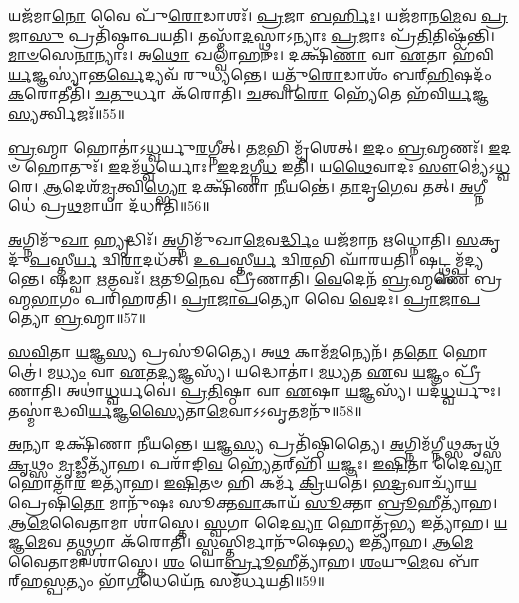 𑌯𑌜᳴𑌮𑌾\-\ul{𑌨𑍋} 𑌵𑍈 𑌪𑍁᳴\-\ul{𑌰𑍋}\-𑌡𑌾𑌶𑌃᳴।
\-\ul{𑌪𑍍𑌰}\-𑌜𑌾 \ul{𑌬}\-\-\ul{𑌰𑍍}\-𑌹𑌿𑌃।
𑌯𑌜᳴𑌮𑌾𑌨\-\ul{𑌮𑍇}\-𑌵 \ul{𑌪𑍍𑌰}\-𑌜𑌾\-\ul{𑌸𑍁} 𑌪𑍍𑌰𑌤𑌿᳴\-𑌷𑍍𑌠𑌾𑌪𑌯𑌤𑌿।
𑌤𑌸𑍍𑌮𑌾᳴\-\ul{𑌦}\-𑌸𑍍𑌥𑍍𑌨𑌾\-𑌽𑌨𑍍𑌯𑌾𑌃 \ul{𑌪𑍍𑌰}\-𑌜𑌾𑌃 𑌪𑍍𑌰᳴\-\ul{𑌤𑌿}\-𑌤𑌿𑌷𑍍𑌠᳴𑌨𑍍𑌤𑌿।
\-\ul{𑌮𑌾}\-\-\ul{𑍞}\-\-𑌸𑍇\-\ul{𑌨𑌾}\-𑌨𑍍𑌯𑌾𑌃।
𑌅\-\ul{𑌥𑍋} 𑌖𑌲𑍍𑌵𑌾᳴𑌹𑍁𑌃।
𑌦𑌕𑍍𑌷𑌿᳴\-\ul{𑌣𑌾} 𑌵𑌾 \ul{𑌏}\-𑌤𑌾 𑌹᳴𑌵𑌿\-\ul{𑌰𑍍𑌯}\-𑌜𑍍𑌞𑌸𑍍𑌯𑌾॑𑌨𑍍𑌤\-\ul{𑌰𑍍𑌵𑍇}\-𑌦𑍍𑌯𑌵᳴ 𑌰𑍁𑌧𑍍𑌯𑌨𑍍𑌤𑍇।
𑌯𑌤𑍍𑌪𑍁᳴\-\ul{𑌰𑍋}\-𑌡𑌾𑌶𑌂᳴ 𑌬𑌰𑍍‌\mbox{}\-\ul{𑌹𑌿}\-𑌷𑌦𑌂᳴ \ul{𑌕}\-𑌰𑍋𑌤𑍀𑌤𑌿᳴।
\-\ul{𑌚}\-\-\ul{𑌤𑍁}\-𑌰𑍍𑌧𑌾 𑌕᳴𑌰𑍋𑌤𑌿।
\-\ul{𑌚}\-𑌤𑍍𑌵𑌾\-\ul{𑌰𑍋} 𑌹𑍍𑌯𑍇᳴𑌤𑍇 𑌹᳴𑌵𑌿\-\ul{𑌰𑍍𑌯}\-𑌜𑍍𑌞\-\ul{𑌸𑍍𑌯}\-𑌰𑍍𑌤𑍍𑌵𑌿𑌜𑌃᳴॥55॥

\-\ul{𑌬𑍍𑌰}\-𑌹𑍍𑌮𑌾 𑌹𑍋𑌤𑌾॑\-𑌽\-\ul{𑌧𑍍𑌵}\-𑌰𑍍𑌯𑍁\-\ul{𑌰}\-𑌗𑍍𑌨𑍀𑌤𑍍।
𑌤\-\ul{𑌮}\-𑌭𑌿 𑌮𑍃᳴𑌶𑍇𑌤𑍍।
\-\ul{𑌇}\-𑌦𑌂 \ul{𑌬𑍍𑌰}\-𑌹𑍍𑌮𑌣𑌃᳴।
\-\ul{𑌇}\-𑌦𑍞 𑌹𑍋𑌤𑍁𑌃᳴।
\-\ul{𑌇}\-𑌦𑌮᳴\-\ul{𑌧𑍍𑌵}\-𑌰𑍍𑌯𑍋𑌃।
\-\ul{𑌇}\-𑌦\-\ul{𑌮}\-𑌗𑍍𑌨𑍀\-\ul{𑌧} 𑌇𑌤𑌿᳴।
𑌯\-\ul{𑌥𑍈}\-𑌵𑌾𑌦𑌃 \ul{𑌸𑍗}\-𑌮𑍍𑌯𑍇॑\-𑌽\-\ul{𑌧𑍍𑌵}\-𑌰𑍇।
\-\ul{𑌆}\-𑌦𑍇𑌶᳴\-\ul{𑌮𑍃}\-𑌤𑍍𑌵𑌿\-\ul{𑌗𑍍𑌭𑍍𑌯𑍋} 𑌦𑌕𑍍𑌷𑌿᳴𑌣𑌾 \ul{𑌨𑍀}\-𑌯𑌨𑍍𑌤𑍇॑।
\-\ul{𑌤𑌾}\-𑌦𑍃\-\ul{𑌗𑍇}\-𑌵 𑌤𑌤𑍍।
\-\ul{𑌅}\-𑌗𑍍𑌨𑍀𑌧𑍇॑ 𑌪𑍍𑌰\-\ul{𑌥}\-𑌮𑌾𑌯𑌾 𑌦᳴𑌧𑌾𑌤𑌿॥56॥

\-\ul{𑌅}\-𑌗𑍍𑌨𑌿𑌮𑍁᳴\-\ul{𑌖𑌾} 𑌹𑍍𑌯𑍃𑌦𑍍𑌧𑌿𑌃᳴।
\-\ul{𑌅}\-𑌗𑍍𑌨𑌿𑌮𑍁᳴𑌖𑌾\-\ul{𑌮𑍇}\-𑌵\-\ul{𑌰𑍍𑌦𑍍𑌧𑌿𑌂} 𑌯𑌜᳴𑌮𑌾𑌨 𑌋𑌧𑍍𑌨𑍋𑌤𑌿।
\-\ul{𑌸}\-𑌕𑍃𑌦𑍁᳴\-\ul{𑌪}\-𑌸𑍍𑌤𑍀\-\ul{𑌰𑍍𑌯} 𑌦𑍍𑌵𑌿\-\ul{𑌰𑌾}\-𑌦𑌧᳴𑌤𑍍।
\-\ul{𑌉}\-\-\ul{𑌪}\-𑌸𑍍𑌤𑍀\-\ul{𑌰𑍍𑌯} 𑌦𑍍𑌵𑌿\-\ul{𑌰}\-𑌭𑌿 𑌘𑌾᳴𑌰𑌯𑌤𑌿।
𑌷𑌟𑍍𑌥𑍍𑌸𑌮𑍍𑌪᳴𑌦𑍍𑌯𑌨𑍍𑌤𑍇।
𑌷𑌡𑍍𑌵𑌾 \ul{𑌋}\-𑌤𑌵𑌃᳴।
\-\ul{𑌋}\-𑌤𑍂\-\ul{𑌨𑍇}\-𑌵 𑌪𑍍𑌰𑍀᳴𑌣𑌾𑌤𑌿।
\-\ul{𑌵𑍇}\-𑌦𑍇𑌨᳴ \ul{𑌬𑍍𑌰}\-𑌹𑍍𑌮𑌣𑍇॑ 𑌬𑍍𑌰𑌹𑍍𑌮\-\ul{𑌭𑌾}\-𑌗𑌂 𑌪𑌰𑌿᳴𑌹𑌰𑌤𑌿।
\-\ul{𑌪𑍍𑌰𑌾}\-\-\ul{𑌜𑌾}\-\-\ul{𑌪}\-𑌤𑍍𑌯𑍋 𑌵𑍈 \ul{𑌵𑍇}\-𑌦𑌃।
\-\ul{𑌪𑍍𑌰𑌾}\-\-\ul{𑌜𑌾}\-\-\ul{𑌪}\-𑌤𑍍𑌯𑍋 \ul{𑌬𑍍𑌰}\-𑌹𑍍𑌮𑌾॥57॥

\-\ul{𑌸}\-\-\ul{𑌵𑌿}\-𑌤𑌾 \ul{𑌯}\-𑌜𑍍𑌞\-\ul{𑌸𑍍𑌯} 𑌪𑍍𑌰𑌸𑍂॑𑌤𑍍𑌯𑍈।
𑌅\-\ul{𑌥} 𑌕𑌾𑌮᳴\-\ul{𑌮}\-𑌨𑍍𑌯𑍇𑌨᳴।
𑌤\-\ul{𑌤𑍋} 𑌹𑍋𑌤𑍍𑌰𑍇॑।
𑌮\-\ul{𑌧𑍍𑌯𑌂} 𑌵𑌾 \ul{𑌏}\-𑌤\-\ul{𑌦𑍍𑌯}\-𑌜𑍍𑌞𑌸𑍍𑌯᳴।
𑌯𑌦𑍍𑌧𑍋𑌤𑌾॑।
\-\ul{𑌮}\-\-\ul{𑌧𑍍𑌯}\-𑌤 \ul{𑌏}\-𑌵 \ul{𑌯}\-𑌜𑍍𑌞𑌂 𑌪𑍍𑌰𑍀᳴𑌣𑌾𑌤𑌿।
𑌅𑌥𑌾॑\-\ul{𑌧𑍍𑌵}\-𑌰𑍍𑌯𑌵𑍇॑।
\-\ul{𑌪𑍍𑌰}\-\-\ul{𑌤𑌿}\-𑌷𑍍𑌠𑌾 𑌵𑌾 \ul{𑌏}\-𑌷𑌾 \ul{𑌯}\-𑌜𑍍𑌞𑌸𑍍𑌯᳴।
𑌯𑌦᳴\-\ul{𑌧𑍍𑌵}\-𑌰𑍍𑌯𑍁𑌃।
𑌤𑌸𑍍𑌮𑌾॑𑌦𑍍𑌧𑌵𑌿\-\ul{𑌰𑍍𑌯}\-𑌜𑍍𑌞\-\ul{𑌸𑍍𑌯𑍈}\-𑌤𑌾\-\ul{𑌮𑍇}\-𑌵𑌾𑌽𑌽𑌵𑍃\-\ul{𑌤}\-𑌮𑌨𑍁᳴॥58॥

\-\ul{𑌅}\-𑌨𑍍𑌯𑌾 𑌦𑌕𑍍𑌷𑌿᳴𑌣𑌾 𑌨𑍀𑌯𑌨𑍍𑌤𑍇।
\-\ul{𑌯}\-𑌜𑍍𑌞\-\ul{𑌸𑍍𑌯} 𑌪𑍍𑌰𑌤𑌿᳴\-𑌷𑍍𑌠𑌿𑌤𑍍𑌯𑍈।
\-\ul{𑌅}\-𑌗𑍍𑌨𑌿𑌮᳴𑌗𑍍𑌨𑍀\-\ul{𑌥𑍍𑌸}\-𑌕𑍃𑌥𑍍𑌸᳴\-\-\ul{𑌕𑍃}\-𑌥𑍍𑌸𑌂 \ul{𑌮𑍃}\-𑌡𑍍𑌢𑍀𑌤𑍍𑌯𑌾᳴𑌹।
𑌪𑌰𑌾᳴𑌙𑌿\-\ul{𑌵} 𑌹𑍍𑌯𑍇᳴𑌤𑌰𑍍‌\mbox{}𑌹𑌿᳴ \ul{𑌯}\-𑌜𑍍𑌞𑌃।
\-\ul{𑌇}\-\-\ul{𑌷𑌿}\-𑌤𑌾 𑌦𑍈\-\ul{𑌵𑍍𑌯𑌾} 𑌹𑍋𑌤𑌾᳴\-\ul{𑌰} 𑌇𑌤𑍍𑌯𑌾᳴𑌹।
\-\ul{𑌇}\-\-\ul{𑌷𑌿}\-𑌤𑍞 𑌹𑌿 𑌕𑌰𑍍𑌮᳴ \ul{𑌕𑍍𑌰𑌿}\-𑌯𑌤𑍇॑।
\-\ul{𑌭}\-\-\ul{𑌦𑍍𑌰}\-𑌵𑌾𑌚𑍍𑌯𑌾᳴\-\ul{𑌯} 𑌪𑍍𑌰𑍇𑌷𑌿᳴\-\ul{𑌤𑍋} 𑌮𑌾𑌨𑍁᳴𑌷𑌃 𑌸𑍂𑌕𑍍𑌤\-\ul{𑌵𑌾}\-𑌕𑌾𑌯᳴ \ul{𑌸𑍂}\-𑌕𑍍𑌤𑌾 \ul{𑌬𑍍𑌰𑍂}\-𑌹𑍀𑌤𑍍𑌯𑌾᳴𑌹।
\-\ul{𑌆}\-\-\-\ul{𑌮𑍇}\-𑌵𑍈𑌤𑌾𑌮𑌾 𑌶𑌾॑𑌸𑍍𑌤𑍇।
\-\ul{𑌸𑍍𑌵}\-𑌗𑌾 𑌦𑍈\-\ul{𑌵𑍍𑌯𑌾} 𑌹𑍋𑌤𑍃᳴\-\ul{𑌭𑍍𑌯} 𑌇𑌤𑍍𑌯𑌾᳴𑌹।
\-\ul{𑌯}\-𑌜𑍍𑌞\-\ul{𑌮𑍇}\-𑌵 𑌤\-\ul{𑌥𑍍𑌸𑍍𑌵}\-𑌗𑌾 𑌕᳴𑌰𑍋𑌤𑌿।
\-\ul{𑌸𑍍𑌵}\-𑌸𑍍𑌤𑌿𑌰𑍍𑌮𑌾𑌨𑍁᳴𑌷𑍇\-\ul{𑌭𑍍𑌯} 𑌇𑌤𑍍𑌯𑌾᳴𑌹।
\-\ul{𑌆}\-\-\-\ul{𑌮𑍇}\-𑌵𑍈𑌤𑌾𑌮𑌾 𑌶𑌾॑𑌸𑍍𑌤𑍇।
\-\ul{𑌶𑌂} 𑌯𑍋\-\ul{𑌰𑍍𑌬𑍍𑌰𑍂}\-𑌹𑍀𑌤𑍍𑌯𑌾᳴𑌹।
\-\ul{𑌶𑌂}\-𑌯𑍁\-\ul{𑌮𑍇}\-𑌵 𑌬𑌾᳴𑌰𑍍‌\mbox{}𑌹\-\ul{𑌸𑍍𑌪}\-𑌤𑍍𑌯𑌂 𑌭𑌾᳴\-\ul{𑌗}\-𑌧𑍇𑌯𑍇᳴\-\ul{𑌨} 𑌸𑌮᳴𑌰𑍍𑌧𑌯𑌤𑌿॥59॥\anuvakamend[\-\ul{𑌚}\-\-\ul{𑌰}\-\-\ul{𑌤𑍍𑌯}\-\-\ul{𑌧𑍍𑌵}\-𑌰𑍍𑌯𑍁𑌃 𑌪𑍍𑌰𑌜𑌾᳴𑌤𑌿𑌰𑍍𑌹𑍍𑌵𑌯\-\ul{𑌤𑍇} 𑌵𑍇𑌦𑌾॑𑌬𑍍𑌰𑌵𑍀𑌦𑍍𑌬𑌰𑍍‌\mbox{}\-\ul{𑌹𑌿}\-𑌷𑌦𑌂᳴ 𑌕𑌰𑍋\-\ul{𑌤𑍍𑌯𑍃}\-𑌤𑍍𑌵𑌿𑌜𑍋᳴ 𑌦𑌧𑌾𑌤𑌿 \ul{𑌬𑍍𑌰}\-𑌹𑍍𑌮𑌾\-𑌽𑌨𑍁᳴𑌕𑌰𑍋𑌤𑌿 \ul{𑌚}\-𑌤𑍍𑌵𑌾𑌰𑌿᳴ 𑌚]

